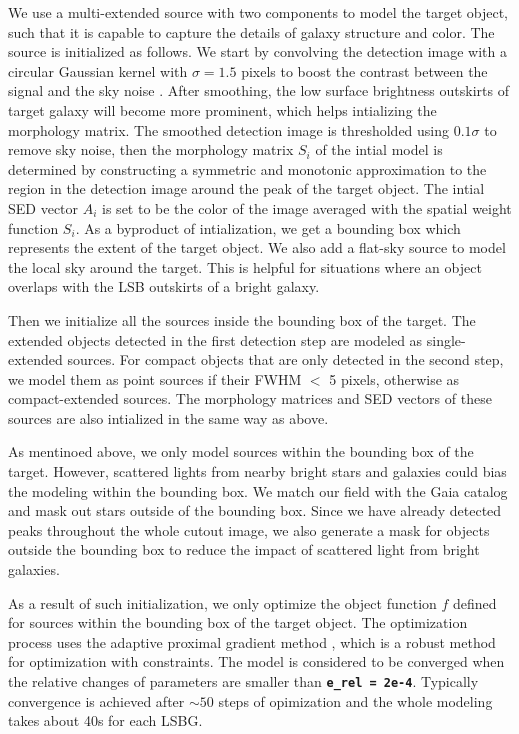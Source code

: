 \documentclass[twocolumn,astrosymb,twocolappendix]{aastex631}
\newcommand{\code}[1]{\textbf{\texttt{#1}}}
\begin{document}
\begin{CJK*}{UTF8}{gbsn}
We use a multi-extended source with two components to model the target object, such that it is capable to capture the details of galaxy structure and color. The source is initialized as follows. We start by convolving the detection image with a circular Gaussian kernel with $\sigma=1.5$ pixels to boost the contrast between the signal and the sky noise \citep[e.g.,][]{Irwin1985,Akhlaghi2015,Greco2018}. After smoothing, the low surface brightness outskirts of target galaxy will become more prominent, which helps intializing the morphology matrix. The smoothed detection image is thresholded using $0.1\sigma$ to remove sky noise, then the morphology matrix $S_i$ of the intial model is determined by constructing a symmetric and monotonic approximation to the region in the detection image around the peak of the target object. The intial SED vector $A_i$ is set to be the color of the image averaged with the spatial weight function $S_i$. As a byproduct of intialization, we get a bounding box which represents the extent of the target object. We also add a flat-sky source to model the local sky around the target. This is helpful for situations where an object overlaps with the LSB outskirts of a bright galaxy.

Then we initialize all the sources inside the bounding box of the target. The extended objects detected in the first detection step are modeled as single-extended sources. For compact objects that are only detected in the second step, we model them as point sources if their FWHM $<$ 5 pixels, otherwise as compact-extended sources. The morphology matrices and SED vectors of these sources are also intialized in the same way as above. 

As mentinoed above, we only model sources within the bounding box of the target. However, scattered lights from nearby bright stars and galaxies could bias the modeling within the bounding box. We match our field with the Gaia catalog and mask out stars outside of the bounding box. Since we have already detected peaks throughout the whole cutout image, we also generate a mask for objects outside the bounding box to reduce the impact of scattered light from bright galaxies. 

As a result of such initialization, we only optimize the object function $f$ defined for sources within the bounding box of the target object. The optimization process uses the adaptive proximal gradient method \citep{Melchior2019}, which is a robust method for optimization with constraints. The model is considered to be converged when the relative changes of parameters are smaller than \code{e\_rel\,=\,2e-4}. Typically convergence is achieved after $\sim 50$ steps of opimization and the whole modeling takes about 40s for each LSBG. 


\end{CJK*}
\end{document}
